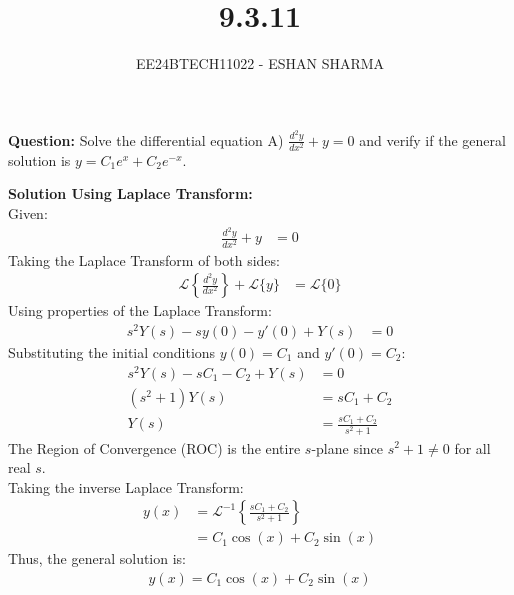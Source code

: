 \documentclass[journal]{IEEEtran}
\begin{document}
	
	
	\vspace{3cm}
	\title{9.3.11}
	\author{EE24BTECH11022 - ESHAN SHARMA}
	{\let\newpage\relax\maketitle}
	
	\renewcommand{\thefigure}{\theenumi}
	\renewcommand{\thetable}{\theenumi}
	\setlength{\intextsep}{10pt} %
	
	
	\renewcommand{\thetable}{\theenumi}
	
	\textbf{Question:} Solve the differential equation A) \( \frac{d^2y}{dx^2} + y = 0 \) and verify if the general solution is $y= C_1e^{x} + C_2e^{-x}$.\\
	
\solution

\textbf{Solution Using Laplace Transform:}\\
Given:
\begin{align}
	\frac{d^2y}{dx^2} + y &= 0
\end{align}
Taking the Laplace Transform of both sides:
\begin{align}
	\mathcal{L}\left\{\frac{d^2y}{dx^2}\right\} + \mathcal{L}\{y\} &= \mathcal{L}\{0\}
\end{align}
Using properties of the Laplace Transform:
\begin{align}
	s^2Y(s) - sy(0) - y'(0) + Y(s) &= 0
\end{align}
Substituting the initial conditions \( y(0) = C_1 \) and \( y'(0) = C_2 \):
\begin{align}
	s^2Y(s) - sC_1 - C_2 + Y(s) &= 0\\
	\left(s^2 + 1\right)Y(s) &= sC_1 + C_2\\
	Y(s) &= \frac{sC_1 + C_2}{s^2 + 1}
\end{align}
The Region of Convergence (ROC) is the entire \( s \)-plane since \( s^2 + 1 \neq 0 \) for all real \( s \).\\

Taking the inverse Laplace Transform:
\begin{align}
	y(x) &= \mathcal{L}^{-1}\left\{\frac{sC_1 + C_2}{s^2 + 1}\right\}\\
	&= C_1\cos(x) + C_2\sin(x)
\end{align}
Thus, the general solution is:
\begin{align}
	y(x) = C_1\cos(x) + C_2\sin(x)
\end{align}
\end{document}
